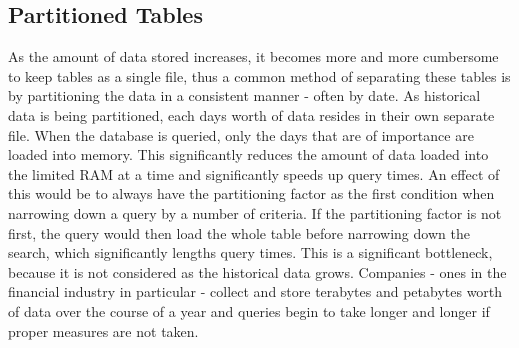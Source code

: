 \subsection{Partitioned Tables} %
\label{sub:data_storage}
As the amount of data stored increases, it becomes more and more cumbersome to keep tables as a single file, thus a common method of separating these tables is by partitioning the data in a consistent manner - often by date.  As historical data is being partitioned, each days worth of data resides in their own separate file.  When the database is queried, only the days that are of importance are loaded into memory.  This significantly reduces the amount of data loaded into the limited RAM at a time and significantly speeds up query times.  An effect of this would be to always have the partitioning factor as the first condition when narrowing down a query by a number of criteria.  If the partitioning factor is not first, the query would then load the whole table before narrowing down the search, which significantly lengths query times.  This is a significant bottleneck, because it is not considered as the historical data grows.  Companies - ones in the financial industry in particular - collect and store terabytes and petabytes worth of data over the course of a year and queries begin to take longer and longer if proper measures are not taken.\newline

